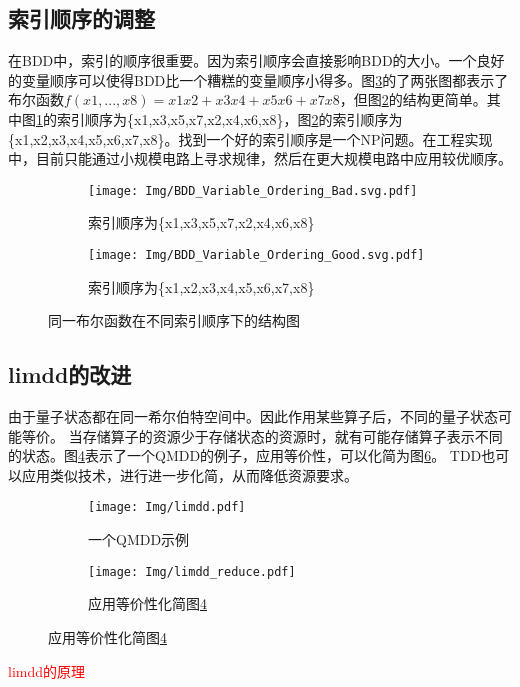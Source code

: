 \subsection*{索引顺序的调整}
\label{contraction}在BDD中，索引的顺序很重要。因为索引顺序会直接影响BDD的大小。一个良好的变量顺序可以使得BDD比一个糟糕的变量顺序小得多。图\ref{fig:bdd-compare}的了两张图都表示了布尔函数$f (x1,...,x8)=x1x2+x3x4+x5x6+x7x8$，但图\ref{fig:bdd-good}的结构更简单。其中图\ref{fig:bdd-bad}的索引顺序为\{x1,x3,x5,x7,x2,x4,x6,x8\}，图\ref{fig:bdd-good}的索引顺序为\{x1,x2,x3,x4,x5,x6,x7,x8\}。找到一个好的索引顺序是一个NP问题。在工程实现中，目前只能通过小规模电路上寻求规律，然后在更大规模电路中应用较优顺序。
\begin{figure}[!htbp]
	\centering
	\begin{subfigure}[b]{.4\textwidth}
        \centering
        \texttt{[image: Img/BDD\_Variable\_Ordering\_Bad.svg.pdf]}
		\caption{索引顺序为\{x1,x3,x5,x7,x2,x4,x6,x8\}}
		\label{fig:bdd-bad}
	\end{subfigure}
    \qquad
	\begin{subfigure}[b]{.4\textwidth}
        \centering
        \texttt{[image: Img/BDD\_Variable\_Ordering\_Good.svg.pdf]}
		\caption{索引顺序为\{x1,x2,x3,x4,x5,x6,x7,x8\}}
		\label{fig:bdd-good}
	\end{subfigure}
	\caption{同一布尔函数在不同索引顺序下的结构图\citep{wiki:bdd}}
	\label{fig:bdd-compare}
\end{figure}


\subsection*{limdd的改进}
由于量子状态都在同一希尔伯特空间中。因此作用某些算子后，不同的量子状态可能等价。
当存储算子的资源少于存储状态的资源时，就有可能存储算子表示不同的状态\citep{vinkhuijzen2023limdd}。图\ref{fig:qmdd-example}表示了一个QMDD的例子，应用等价性，可以化简为图\ref{fig:limdd-example}。
TDD也可以应用类似技术，进行进一步化简，从而降低资源要求。
\begin{figure}[!htbp]
    \centering
    \begin{subfigure}[b]{.4\textwidth}
        \centering
        \texttt{[image: Img/limdd.pdf]}
        \caption{一个QMDD示例}
        \label{fig:qmdd-example}
    \end{subfigure}
    \begin{subfigure}[b]{.4\textwidth}
        \centering
        \texttt{[image: Img/limdd\_reduce.pdf]}
        \caption{应用等价性化简图\ref{fig:qmdd-example}}
        \label{fig:limdd-example}
    \end{subfigure}
\end{figure}
\textcolor{red}{limdd的原理}


